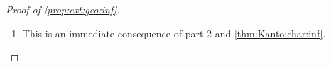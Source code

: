 \documentclass[noinfoline]{imsart}\setcounter{tocdepth}{2}
\newcommand{\m}[1]{\mathbf{#1}} %
\renewcommand{\c}[1]{\mathcal{#1}} %
\theoremstyle{plain}
\begin{document}
\begin{proof}[Proof of \cref{prop:ext:geo:inf}]
\begin{enumerate}[leftmargin = *]
To ease the notation, let us denote 
\begin{align*}
    \m{X}_{11} := [(1-t) \m{G}_{11} + t \m{M}_{11}] = [(1-t) \m{G}_{11} + t (\m{G}_{11}^{*})^{\dagger} (\m{G}_{11}^{*} \m{B}_{11} \m{G}_{11})^{1/2} \m{G}_{11}^{-1}] \m{G}_{11}, 
\end{align*}
which is injective. Then, the $\m{A}$-Schur complement of $\m{\Gamma}_{t}$ is given by
\begin{align*}
    \m{\Gamma}_{t}/\m{A} &= (\m{\Gamma}_{t})_{22} - \overline{(\m{\Gamma}_{t})_{21} (\m{\Gamma}_{t})_{11}^{\dagger} (\m{\Gamma}_{t})_{12}} \\
    &= t^{2} \m{M}_{22} \m{M}_{22}^{*} + t^{2} \m{M}_{21} \overline{\left[ \m{I}_{11} - \m{X}_{11}^{*} (\m{X}_{11} \m{X}_{11}^{*})^{\dagger} \m{X}_{11}  \right]} \m{M}_{21}^{*} \\
    &= t^{2} \m{M}_{22} \m{M}_{22}^{*} + t^{2} \m{M}_{21} \m{\Pi}_{\c{N}(\m{X}_{11})} \m{M}_{21}^{*} = t^{2} \m{M}_{22} = t^{2} [\m{B}/\m{A} - \m{N}_{12}^{*} \m{N}_{12}].
\end{align*}

\item This is an immediate consequence of part 2 and \cref{thm:Kanto:char:inf}.
\end{enumerate}
\end{proof}
\end{document}
